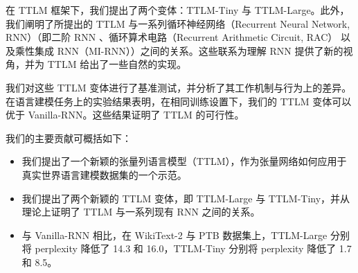 在 TTLM 框架下，我们提出了两个变体：TTLM-Tiny 与 TTLM-Large。此外，我们阐明了所提出的 TTLM 与一系列循环神经网络（Recurrent Neural Network, RNN）（即二阶 RNN \citep{goudreau1994first}、循环算术电路（Recurrent Arithmetic Circuit, RAC）\citep{levine2018benefits} 以及乘性集成 RNN（MI-RNN）\citep{wu_multiplicative_2016}）之间的关系。这些联系为理解 RNN 提供了新的视角，并为 TTLM 给出了一些自然的实现。


我们对这些 TTLM 变体进行了基准测试，并分析了其工作机制与行为上的差异。在语言建模任务上的实验结果表明，在相同训练设置下，我们的 TTLM 变体可以优于 Vanilla-RNN。这些结果证明了 TTLM 的可行性。


我们的主要贡献可概括如下：
\begin{itemize}
    \item 我们提出了一个新颖的张量列语言模型（TTLM），作为张量网络如何应用于真实世界语言建模数据集的一个示范。
    \item 我们提出了两个新颖的 TTLM 变体，即 TTLM-Large 与 TTLM-Tiny，并从理论上证明了 TTLM 与一系列现有 RNN 之间的关系。
    \item 与 Vanilla-RNN 相比，在 WikiText-2 与 PTB 数据集上，TTLM-Large 分别将 perplexity 降低了 14.3 和 16.0，TTLM-Tiny 分别将 perplexity 降低了 1.7 和 8.5。
\end{itemize}


